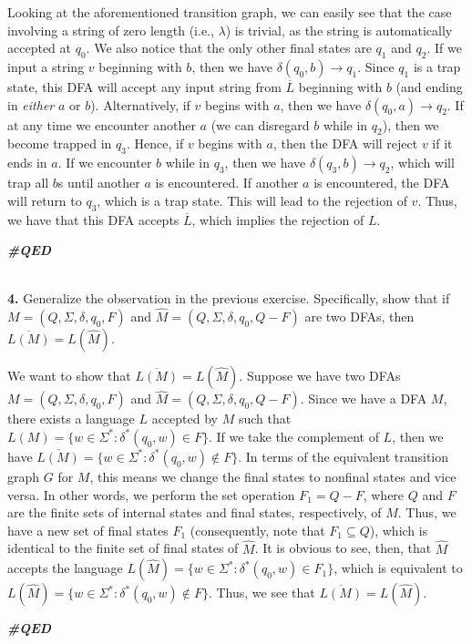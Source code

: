 \documentclass[12pt,letter]{article}
\newcommand{\QED}{
	\begin{flushright}
		\textit{\textbf{\#QED}}
	\end{flushright}
	\ \\
}
\begin{document}
Looking at the aforementioned transition graph, we can easily see that the case involving a string of zero length (i.e., $\lambda$) is trivial, as the string is automatically accepted at $q_0$. We also notice that the only other final states are $q_1$ and $q_2$. If we input a string $v$ beginning with $b$, then we have $\delta (q_0, b) \rightarrow q_1$. Since $q_1$ is a trap state, this DFA will accept any input string from $\overline{L}$ beginning with $b$ (and ending in \textit{either} $a$ or $b$). Alternatively, if $v$ begins with $a$, then we have $\delta (q_0, a) \rightarrow q_2$. If at any time we encounter another $a$ (we can disregard $b$ while in $q_2$), then we become trapped in $q_3$. Hence, if $v$ begins with $a$, then the DFA will reject $v$ if it ends in $a$. If we encounter $b$ while in $q_3$, then we have $\delta (q_3, b) \rightarrow q_2$, which will trap all $b$s until another $a$ is encountered. If another $a$ is encountered, the DFA will return to $q_3$, which is a trap state. This will lead to the rejection of $v$. Thus, we have that this DFA accepts $\overline{L}$, which implies the rejection of $L$. \QED


\textbf{4.} Generalize the observation in the previous exercise. Specifically, show that if $M = (Q, \Sigma, \delta, q_0, F)$ and $\widehat{M} = (Q, \Sigma, \delta, q_0, Q - F)$ are two DFAs, then $\overline{L(M)} = L(\widehat{M})$.

We want to show that $\overline{L(M)} = L(\widehat{M})$. Suppose we have two DFAs $M = (Q, \Sigma, \delta, q_0, F)$ and $\widehat{M} = (Q, \Sigma, \delta, q_0, Q - F)$. Since we have a DFA $M$, there exists a language $L$ accepted by $M$ such that $L(M) = \lbrace w \in \Sigma^{*} : \delta^{*}(q_0, w) \in F \rbrace$. If we take the complement of $L$, then we have $\overline{L(M)} = \lbrace w \in \Sigma^{*} : \delta^{*}(q_0, w) \not\in F \rbrace$. In terms of the equivalent transition graph $G$ for $M$, this means we change the final states to nonfinal states and vice versa. In other words, we perform the set operation $F_1 = Q - F$, where $Q$ and $F$ are the finite sets of internal states and final states, respectively, of $M$. Thus, we have a new set of final states $F_1$ (consequently, note that $F_1 \subseteq Q$), which is identical to the finite set of final states of $\widehat{M}$. It is obvious to see, then, that $\widehat{M}$ accepts the language $L(\widehat{M}) = \lbrace w \in \Sigma^{*} : \delta^{*}(q_0, w) \in F_1 \rbrace$, which is equivalent to $L(\widehat{M}) = \lbrace w \in \Sigma^{*} : \delta^{*}(q_0, w) \not\in F \rbrace$. Thus, we see that $\overline{L(M)} = L(\widehat{M})$.  \QED
\end{document}
